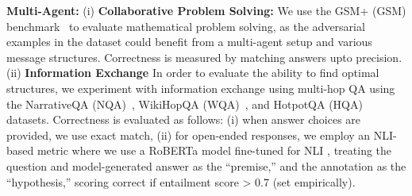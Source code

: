 \textbf{Multi-Agent:}
(i) \textbf{Collaborative Problem Solving:}
We use the GSM+ (GSM) benchmark~\cite{gsmplus} to evaluate mathematical problem solving, as the adversarial examples in the dataset could benefit from a multi-agent setup and various message structures. 
Correctness is measured by matching answers upto precision.
(ii) \textbf{Information Exchange}
In order to evaluate the ability to find optimal structures, we experiment with information exchange using multi-hop QA using the NarrativeQA (NQA)~\cite{narrativeqa}, WikiHopQA (WQA)~\cite{wikihop}, and HotpotQA (HQA)~\cite{hotpotqa} datasets. Correctness is evaluated as follows: (i) when answer choices are provided, we use exact match, (ii) for open-ended responses, we employ an NLI-based metric where we use a RoBERTa model fine-tuned for NLI \cite{roberta_nli}, treating the question and model-generated answer as the ``premise,'' and the annotation as the ``hypothesis,'' scoring correct if entailment score > 0.7 (set empirically). 


